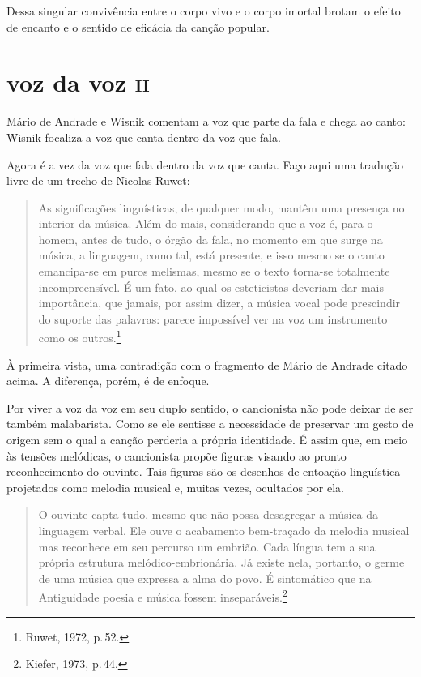 Dessa singular convivência entre o corpo vivo e o corpo imortal brotam o
efeito de encanto e o sentido de eficácia da canção popular.

\section{voz da voz \textsc{ii}}

Mário de Andrade e Wisnik comentam a voz que parte da fala e chega ao
canto: Wisnik focaliza a voz que canta dentro da voz que fala.

Agora é a vez da voz que fala dentro da voz que canta. Faço aqui uma
tradução livre de um trecho de Nicolas Ruwet:

\begin{quote}
As significações linguísticas, de qualquer modo, mantêm uma presença no
interior da música. Além do mais, considerando que a voz é, para o
homem, antes de tudo, o órgão da fala, no momento em que surge na
música, a linguagem, como tal, está presente, e isso mesmo se o canto
emancipa-se em puros melismas, mesmo se o texto torna-se totalmente
incompreensível. É um fato, ao qual os esteticistas deveriam dar mais
importância, que jamais, por assim dizer, a música vocal pode prescindir
do suporte das palavras: parece impossível ver na voz um instrumento
como os outros.\footnote{Ruwet, 1972, p.\,52.} 
\end{quote}

À primeira vista, uma contradição com o fragmento de Mário de Andrade
citado acima. A diferença, porém, é de enfoque.

Por viver a voz da voz em seu duplo sentido, o cancionista não pode
deixar de ser também malabarista. Como se ele sentisse a necessidade de
preservar um gesto de origem sem o qual a canção perderia a própria
identidade. É assim que, em meio às tensões melódicas, o cancionista
propõe figuras visando ao pronto reconhecimento do ouvinte. Tais figuras
são os desenhos de entoação linguística projetados como melodia musical
e, muitas vezes, ocultados por ela.

\begin{quote}
O ouvinte capta tudo, mesmo que não possa desagregar a música da
linguagem verbal. Ele ouve o acabamento bem-traçado da melodia musical
mas reconhece em seu percurso um embrião. Cada língua tem a sua própria
estrutura melódico-embrionária. Já existe nela, portanto, o germe de uma
música que expressa a alma do povo. É sintomático que na Antiguidade
poesia e música fossem inseparáveis.\footnote{Kiefer, 1973, p.\,44.}
\end{quote}

